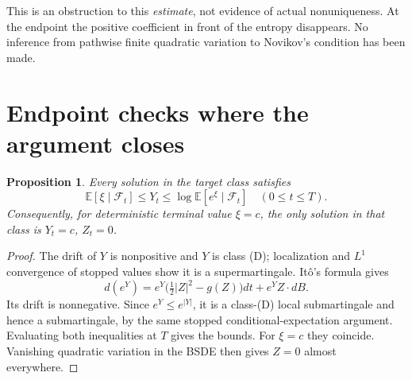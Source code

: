 \documentclass[11pt]{article}
\newtheorem{proposition}[theorem]{Proposition}
\newcommand{\E}{\mathbb E}
\newcommand{\F}{\mathcal F}
\begin{document}
This is an obstruction to this \emph{estimate}, not evidence of actual
nonuniqueness. At the endpoint the positive coefficient in front of the
entropy disappears. No inference from pathwise finite quadratic variation
to Novikov's condition has been made.

\section{Endpoint checks where the argument closes}
\begin{proposition}\label{bounds}
Every solution in the target class satisfies
\[
 \E[\xi\mid\F_t]\leq Y_t\leq\log\E[e^\xi\mid\F_t]
 \quad(0\leq t\leq T).
\]
Consequently, for deterministic terminal value $\xi=c$, the only solution
in that class is $Y_t=c$, $Z_t=0$.
\end{proposition}
\begin{proof}
The drift of $Y$ is nonpositive and $Y$ is class (D); localization and
$L^1$ convergence of stopped values show it is a supermartingale.
It\^o's formula gives
\[
 d(e^Y)=e^Y\bigl(\tfrac12|Z|^2-g(Z)\bigr)dt+e^YZ\cdot dB.
\]
Its drift is nonnegative. Since $e^Y\leq e^{|Y|}$, it is a class-(D)
local submartingale and hence a submartingale, by the same stopped
conditional-expectation argument. Evaluating both inequalities at $T$
gives the bounds. For $\xi=c$ they coincide. Vanishing quadratic
variation in the BSDE then gives $Z=0$ almost everywhere.
\end{proof}
\end{document}
